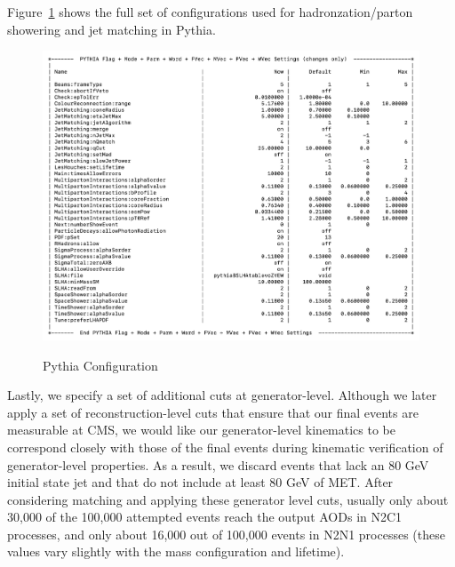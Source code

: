 \documentclass{article}
\begin{document}
\par
Figure~\ref{fig:7} shows the full set of configurations used for hadronzation/parton showering and jet matching in Pythia.
\begin{figure}[H]
    \centering
    \caption{Pythia Configuration} 
    \includegraphics[width=12cm]{PythiaConfigs.png}
    \label{fig:7}
\end{figure}
\par
Lastly, we specify a set of additional cuts at generator-level. Although we later apply a set of reconstruction-level cuts that ensure that our final events are measurable at CMS, we would like our generator-level kinematics to be correspond closely with those of the final events during kinematic verification of generator-level properties. As a result, we discard events that lack an 80 GeV initial state jet and that do not include at least 80 GeV of MET. After considering matching and applying these generator level cuts, usually only about 30,000 of the 100,000 attempted events reach the output AODs in N2C1 processes, and only about 16,000 out of 100,000 events in N2N1 processes (these values vary slightly with the mass configuration and lifetime).
\end{document}
